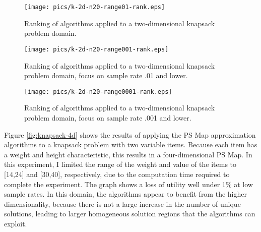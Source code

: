 \begin{figure}
\begin{center}
\texttt{[image: pics/k-2d-n20-range01-rank.eps]}
\caption{Ranking of algorithms applied to a two-dimensional knapsack problem domain.}
\label{fig:knapsack-2d-range01-rank}
\end{center}
\end{figure}


\begin{figure}
\begin{center}
\texttt{[image: pics/k-2d-n20-range001-rank.eps]}
\caption{Ranking of algorithms applied to a two-dimensional knapsack problem domain, focus on sample rate .01 and lower.}
\label{fig:knapsack-2d-range001-rank}
\end{center}
\end{figure}

\begin{figure}
\begin{center}
\texttt{[image: pics/k-2d-n20-range0001-rank.eps]}
\caption{Ranking of algorithms applied to a two-dimensional knapsack problem domain, focus on sample rate .001 and lower.}
\label{fig:knapsack-2d-range0001-rank}
\end{center}
\end{figure}


Figure \ref{fig:knapsack-4d} shows the results of applying the PS Map approximation algorithms to a knapsack problem with two variable items.  Because each item has a weight and height characteristic, this results in a four-dimensional PS Map.  In this experiment, I limited the range of the weight and value of the items to [14,24] and [30,40], respectively, due to the computation time required to complete the experiment.  The graph shows a loss of utility well under 1\% at low sample rates.  In this domain, the algorithms appear to benefit from the higher dimensionality, because there is not a large increase in the number of unique solutions, leading to larger homogeneous solution regions that the algorithms can exploit.



